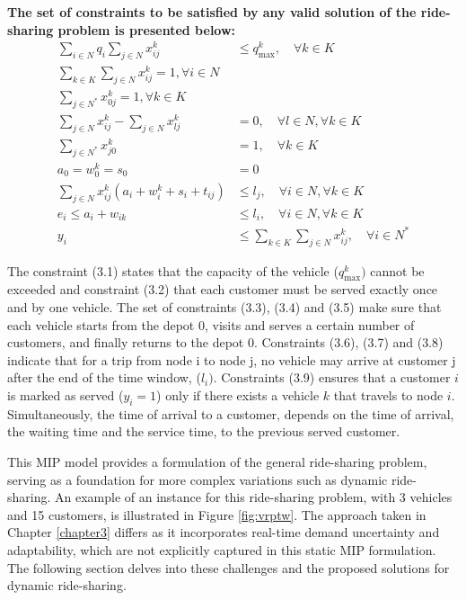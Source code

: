 \textbf{The set of constraints to be satisfied by any valid solution of the ride-sharing problem is presented below:}
\begin{align}
    \sum_{i \in N} q_i \sum_{j \in N} x_{ij}^k &\leq q_{\text{max}}^k, \quad \forall k \in K \tag{3.1} \\
    \sum_{k \in K} \sum_{j \in N} x_{ij}^k =1, \forall i \in N \tag{3.2}\\
    \sum_{j \in N^*} x_{0j}^k =1, \forall k \in K \tag{3.3}\\
    \sum_{j \in N} x_{ij}^k - \sum_{j \in N} x_{lj}^k &= 0, \quad \forall l \in N, \forall k \in K \tag{3.4} \\
    \sum_{j \in N^*} x_{j0}^k &= 1, \quad \forall k \in K \tag{3.5} \\
    a_0 = w_{0}^k = s_0 &= 0 \tag{3.6} \\
   \sum_{j \in N} x_{ij}^k( a_i + w_{i}^k + s_i + t_{ij}) &\leq l_j, \quad \forall i \in N, \forall k \in K \tag{3.7} \\
    e_i \leq a_i + w_{ik} &\leq l_i, \quad \forall i \in N, \forall k \in K \tag{3.8} \\
    y_i &\leq \sum_{k \in K} \sum_{j \in N} x_{ij}^k, \quad \forall i \in N^* \tag{3.9}
\end{align}

The constraint (3.1) states that the capacity of the vehicle (\(q_{\text{max}}^k)\) cannot be exceeded and constraint (3.2) that each customer must be served exactly once and by one vehicle. The set of constraints (3.3), (3.4) and (3.5) make sure that each vehicle starts from the depot {0}, visits and serves a certain number of customers, and finally returns to the depot {0}. Constraints (3.6), (3.7) and (3.8) indicate that for a trip from node i to node j, no vehicle may arrive at customer j after the end of the time window, (\(l_i)\). Constraints (3.9) ensures that a customer \( i \) is marked as served (\( y_i = 1 \)) only if there exists a vehicle \( k \) that travels to node \( i \). Simultaneously, the time of arrival to a customer, depends on the time of arrival, the waiting time and the service time, to the previous served customer. 

This MIP model provides a formulation of the general ride-sharing problem, serving as a foundation for more complex variations such as dynamic ride-sharing. An example of an instance for this ride-sharing problem, with 3 vehicles and 15 customers, is illustrated in Figure \ref{fig:vrptw}. The approach taken in Chapter  \ref{chapter3} differs as it incorporates real-time demand uncertainty and adaptability, which are not explicitly captured in this static MIP formulation. The following section delves into these challenges and the proposed solutions for dynamic ride-sharing. 


